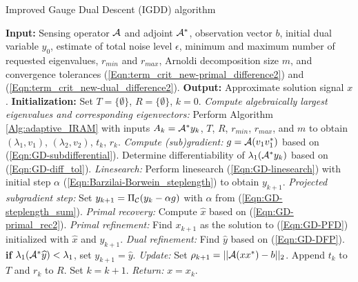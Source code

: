 \begin{algorithm}[H]
\caption{Improved Gauge Dual Descent (IGDD) algorithm} 	\label{Alg:PGD-improved}

\begin{algorithmic}[1]
	\Statex 	\textbf{Input:} Sensing operator ${\mathcal A}$ and adjoint ${\mathcal A}^*$, observation vector $b$,
	initial dual variable $y_0$, 
	estimate of total noise level $\epsilon$,  
	minimum and maximum number of requested eigenvalues, $r_{min}$ and $r_{max}$, 
	Arnoldi decomposition size $m$,
	and convergence tolerances (\ref{Eqn:term_crit_new-primal_difference2}) and (\ref{Eqn:term_crit_new-dual_difference2}).
	\Statex 	\textbf{Output:} Approximate solution signal $x$.
	\Statex		\textbf{Initialization:} Set $T = \{ \emptyset \}$, $R = \{ \emptyset \}$, $k = 0$.
		\State 		\textit{Compute algebraically largest eigenvalues and corresponding eigenvectors:} 
		Perform Algorithm \ref{Alg:adaptive_IRAM} with inputs $A_k = {\mathcal A}^*y_k$, $T$, $R$, $r_{min}$, $r_{max}$, and $m$ to obtain	
		$(\lambda_1, v_1)$, $(\lambda_2, v_2)$, $t_k$, $r_k$.
		\State 		\textit{Compute (sub)gradient:} $g = {\mathcal A}(v_1 v_1^*)$ based on  (\ref{Eqn:GD-subdifferential}).
		\State		Determine differentiability of $\lambda_1({\mathcal A}^*y_k)$ based on (\ref{Eqn:GD-diff_tol}).
			\State		\textit{Linesearch:} Perform linesearch (\ref{Eqn:GD-linesearch}) with initial step $\alpha$ (\ref{Eqn:Barzilai-Borwein_steplength}) to obtain $y_{k+1}$.	
		\Else
			\State		\textit{Projected subgradient step:} Set $y_{k+1} = \Pi_{\mathcal C} (y_k - \alpha g)$ with $\alpha$ from (\ref{Eqn:GD-steplength_sum}).
		\EndIf
		\State		\textit{Primal recovery:} Compute $\hat{x}$ based on (\ref{Eqn:GD-primal_rec2}).
		\State		\textit{Primal refinement:} Find $x_{k+1}$ as the solution to (\ref{Eqn:GD-PFD}) initialized with $\hat{x}$ and $y_{k+1}$.
		 {}
			\State		\textit{Dual refinement:} Find $\widehat{y}$ based on (\ref{Eqn:GD-DFP}).
			\State		\textbf{if} $\lambda_1({\mathcal A}^* \widehat{y}) < \lambda_1$, set $y_{k+1} = \widehat{y}$.
		\EndIf
			\State	\textit{Update:} Set $\rho_{k+1} = ||{\mathcal A}(xx^*) - b||_2$. Append $t_k$ to $T$ and $r_k$ to $R$. Set $k = k+1$.
	\EndWhile
	\State	\textit{Return:} $x = x_k$. 
\end{algorithmic}

\end{algorithm}


